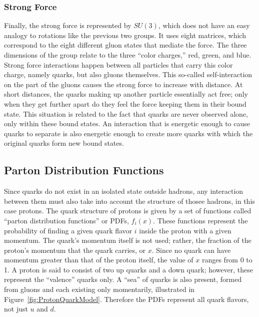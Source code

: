 \subsubsection{Strong Force}
\label{theory:strong}
Finally, the strong force is represented by $SU(3)$, 
which does not have an easy analogy to rotations 
like the previous two groups.  
It uses eight matrices, which correspond to the 
eight different gluon states that mediate the force.  
The three dimensions of the group relate to the 
three ``color charges,'' red, green, and blue.  
Strong force interactions happen between all particles 
that carry this color charge, 
namely quarks, but also gluons themselves.  
This so-called self-interaction on the part of the gluons 
causes the strong force to increase with distance.  
At short distances, the quarks making up another particle 
essentially act free; 
only when they get further apart do they feel the force 
keeping them in their bound state.  
This situation is related to the fact that quarks are 
never observed alone, only within these bound states.  
An interaction that is energetic enough to cause 
quarks to separate is also energetic enough to 
create more quarks with which the original quarks 
form new bound states.  


\subsection{Parton Distribution Functions}
\label{theory:pdf}

Since quarks do not exist in an isolated state 
outside hadrons, 
any interaction between them must also take 
into account the structure of thosee hadrons, 
in this case protons.  
The quark structure of protons is given 
by a set of functions called 
``parton distribution functions'' or PDFs, 
$f_i(x)$. 
These functions represent the probability 
of finding a given quark flavor $i$ inside 
the proton with a given momentum.  
The quark's momentum itself is not used; 
rather, the fraction of the proton's 
momentum that the quark carries, or $x$. 
Since no quark can have momentum greater 
than that of the proton itself, 
the value of $x$ ranges from 0 to 1.  
A proton is said to consist of two up quarks 
and a down quark; 
however, these represent the ``valence'' quarks only.  
A ``sea'' of quarks is also present, 
formed from gluons and each existing only 
momentarily, 
illustrated in Figure~\ref{fig:ProtonQuarkModel}.  
Therefore the PDFs represent all quark 
flavors, not just $u$ and $d$.  

